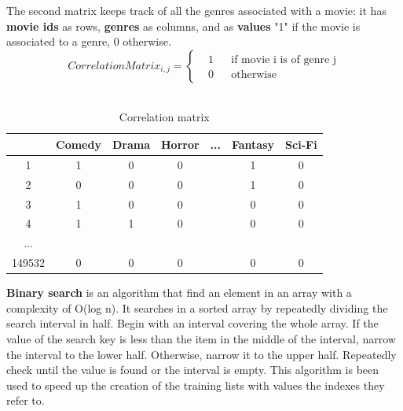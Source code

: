\documentclass{article}
\begin{document}
The second matrix keeps track of all the genres associated with a movie: it has \textbf{movie ids} as rows, \textbf{genres} as columns, and as \textbf{values} "1" if the movie is associated to a genre, 0 otherwise. \\

\begin{equation}
      \label{eqn:movieMatrix}
      CorrelationMatrix_{i,j} = \left \{
            \begin{aligned}
                  &1 && \text{if movie i is of genre j}\\
                  &0 && \text{otherwise}
            \end{aligned} \right.
\end{equation} \\ 

\begin{table}[ht]
      \begin{center}
            \begin{tabular}{ | c | c | c | c | c | c | c |} 
              \hline
              \rowcolor{lightgray}  & Comedy & Drama & Horror & ... & Fantasy & Sci-Fi \\ 
              \hline
               \cellcolor{lightgray}1 & 1 & 0 & 0 &  & 1 & 0 \\ 
              \hline
              \cellcolor{lightgray}2 & 0 & 0 & 0 &  & 1 & 0 \\ 
              \hline
              \cellcolor{lightgray}3 & 1 & 0 & 0 &  & 0 & 0\\
              \hline
              \cellcolor{lightgray}4 & 1 & 1 & 0 &  & 0 & 0\\
              \hline
              \cellcolor{lightgray}... &  &  &  &  &  & \\ 
              \hline
              \cellcolor{lightgray}149532 & 0 & 0 & 0 &  & 0 & 0\\
              \hline
            \end{tabular}
            \caption{Correlation matrix}
            \label{Tab: Correlation matrix}
      \end{center}
\end{table}


\textbf{Binary search} is an algorithm that find an element in an array with a complexity of O(log n). It searches in a sorted array by repeatedly dividing the search interval in half. Begin with an interval covering the whole array. If the value of the search key is less than the item in the middle of the interval, narrow the interval to the lower half. Otherwise, narrow it to the upper half. Repeatedly check until the value is found or the interval is empty.
This algorithm is been used to speed up the creation of the training lists with values the indexes they refer to.\\
\end{document}
